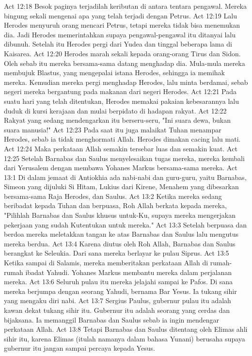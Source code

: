 Act 12:18  Besok paginya terjadilah keributan di antara tentara pengawal. Mereka bingung sekali mengenai apa yang telah terjadi dengan Petrus.
Act 12:19  Lalu Herodes menyuruh orang mencari Petrus, tetapi mereka tidak bisa menemukan dia. Jadi Herodes memerintahkan supaya pengawal-pengawal itu ditanyai lalu dibunuh. Setelah itu Herodes pergi dari Yudea dan tinggal beberapa lama di Kaisarea.
Act 12:20  Herodes marah sekali kepada orang-orang Tirus dan Sidon. Oleh sebab itu mereka bersama-sama datang menghadap dia. Mula-mula mereka membujuk Blastus, yang mengepalai istana Herodes, sehingga ia memihak mereka. Kemudian mereka pergi menghadap Herodes, lalu minta berdamai, sebab negeri mereka bergantung pada makanan dari negeri Herodes.
Act 12:21  Pada suatu hari yang telah ditentukan, Herodes memakai pakaian kebesarannya lalu duduk di kursi kerajaan dan mulai berpidato di hadapan rakyat.
Act 12:22  Rakyat yang sedang mendengarkan itu berseru-seru, "Ini suara dewa, bukan suara manusia!"
Act 12:23  Pada saat itu juga malaikat Tuhan menampar Herodes, sebab ia tidak menghormati Allah. Herodes dimakan cacing lalu mati.
Act 12:24  Maka perkataan Allah semakin tersebar luas dan semakin kuat.
Act 12:25  Setelah Barnabas dan Saulus menyelesaikan tugas mereka, mereka kembali dari Yerusalem dengan membawa Yohanes Markus bersama-sama mereka.
Act 13:1  Di dalam jemaat di Antiokhia ada nabi-nabi dan guru-guru, yaitu Barnabas, Simeon yang dijuluki Si Hitam, Lukius dari Kirene, Menahem yang dibesarkan bersama-sama Raja Herodes, dan Saulus.
Act 13:2  Ketika mereka sedang beribadat kepada Tuhan dan berpuasa, Roh Allah berkata kepada mereka, "Pilihlah Barnabas dan Saulus khusus untuk-Ku, supaya mereka mengerjakan pekerjaan yang sudah Kutentukan untuk mereka."
Act 13:3  Setelah berpuasa dan berdoa mereka meletakkan tangan ke atas Barnabas dan Saulus lalu mengutus mereka berdua.
Act 13:4  Karena diutus oleh Roh Allah, Barnabas dan Saulus berangkat ke Seleukia. Dari sana mereka berlayar ke pulau Siprus.
Act 13:5  Ketika sampai di Salamis, mereka memberitakan perkataan Allah di rumah-rumah ibadat Yahudi. Yohanes Markus membantu mereka dalam perjalanan mereka.
Act 13:6  Seluruh pulau itu mereka jelajahi sampai ke Pafos. Di sana mereka berjumpa dengan seorang Yahudi, bernama Bar Yesus. Ia tukang sihir yang mengaku diri nabi.
Act 13:7  Sergius Paulus, gubernur pulau itu adalah kawan dekat tukang sihir itu. Gubernur itu adalah seorang yang cerdas dan bijaksana. Ia memanggil Barnabas dan Saulus sebab ia ingin mendengar perkataan Allah.
Act 13:8  Tetapi Barnabas dan Saulus ditentang oleh Elimas ahli sihir itu, karena Elimas (itulah namanya dalam bahasa Yunani) berusaha supaya gubernur itu jangan sampai percaya kepada Yesus.
